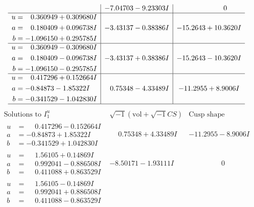 \documentclass[1p]{elsarticle_modified}
\theoremstyle{definition}
\newcommand{\I}{\sqrt{-1}}
\begin{document}
$$\begin{array}{c|c|c}
 & -7.04703 - 9.23303 I & \phantom{-0.000000 } 0 \\ \hline\begin{aligned}
u &= \phantom{-}0.360949 + 0.309680 I \\
a &= \phantom{-}0.180409 + 0.096738 I \\
b &= -1.096150 + 0.295785 I\end{aligned}
 & -3.43137 - 0.38386 I & -15.2643 + 10.3620 I \\ \hline\begin{aligned}
u &= \phantom{-}0.360949 - 0.309680 I \\
a &= \phantom{-}0.180409 - 0.096738 I \\
b &= -1.096150 - 0.295785 I\end{aligned}
 & -3.43137 + 0.38386 I & -15.2643 - 10.3620 I \\ \hline\begin{aligned}
u &= \phantom{-}0.417296 + 0.152664 I \\
a &= -0.84873 - 1.85322 I \\
b &= -0.341529 - 1.042830 I\end{aligned}
 & \phantom{-}0.75348 - 4.33489 I & -11.2955 + 8.9006 I\\
 \hline 
 \end{array}$$\newpage$$\begin{array}{c|c|c}  
\text{Solutions to }I^u_{1}& \I (\text{vol} + \sqrt{-1}CS) & \text{Cusp shape}\\
 \hline 
\begin{aligned}
u &= \phantom{-}0.417296 - 0.152664 I \\
a &= -0.84873 + 1.85322 I \\
b &= -0.341529 + 1.042830 I\end{aligned}
 & \phantom{-}0.75348 + 4.33489 I & -11.2955 - 8.9006 I \\ \hline\begin{aligned}
u &= \phantom{-}1.56105 + 0.14869 I \\
a &= \phantom{-}0.992041 - 0.886508 I \\
b &= \phantom{-}0.411088 + 0.863529 I\end{aligned}
 & -8.50171 - 1.93111 I & \phantom{-0.000000 } 0 \\ \hline\begin{aligned}
u &= \phantom{-}1.56105 - 0.14869 I \\
a &= \phantom{-}0.992041 + 0.886508 I \\
b &= \phantom{-}0.411088 - 0.863529 I\end{aligned}

\end{array}$$
\end{document}
